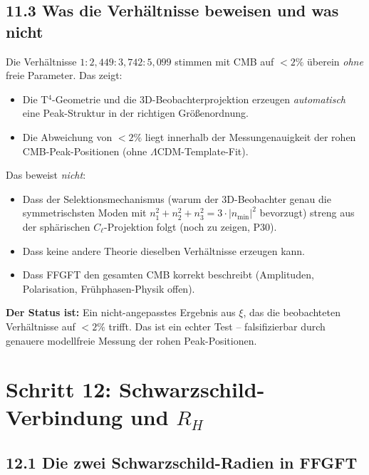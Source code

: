 \subsection*{11.3 Was die Verhältnisse beweisen und was nicht}

Die Verhältnisse $1:2{,}449:3{,}742:5{,}099$ stimmen mit CMB auf
$< 2\%$ überein \emph{ohne} freie Parameter. Das zeigt:

\begin{itemize}
  \item Die T$^4$-Geometrie und die 3D-Beobachterprojektion erzeugen
        \emph{automatisch} eine Peak-Struktur in der richtigen
        Größenordnung.
  \item Die Abweichung von $< 2\%$ liegt innerhalb der
        Messungenauigkeit der rohen CMB-Peak-Positionen
        (ohne $\Lambda$CDM-Template-Fit).
\end{itemize}

Das beweist \emph{nicht}:

\begin{itemize}
  \item Dass der Selektionsmechanismus (warum der 3D-Beobachter genau
        die symmetrischsten Moden mit $n_1^2+n_2^2+n_3^2 = 3\cdot|n_\mathrm{min}|^2$
        bevorzugt) streng aus der sphärischen $C_\ell$-Projektion folgt
        (noch zu zeigen, P30).
  \item Dass keine andere Theorie dieselben Verhältnisse erzeugen kann.
  \item Dass FFGFT den gesamten CMB korrekt beschreibt
        (Amplituden, Polarisation, Frühphasen-Physik offen).
\end{itemize}

\textbf{Der Status ist:} Ein nicht-angepasstes Ergebnis aus $\xi$,
das die beobachteten Verhältnisse auf $< 2\%$ trifft.
Das ist ein echter Test -- falsifizierbar durch genauere
modellfreie Messung der rohen Peak-Positionen.

\section{Schritt 12: Schwarzschild-Verbindung und $R_H$}

\subsection*{12.1 Die zwei Schwarzschild-Radien in FFGFT}

